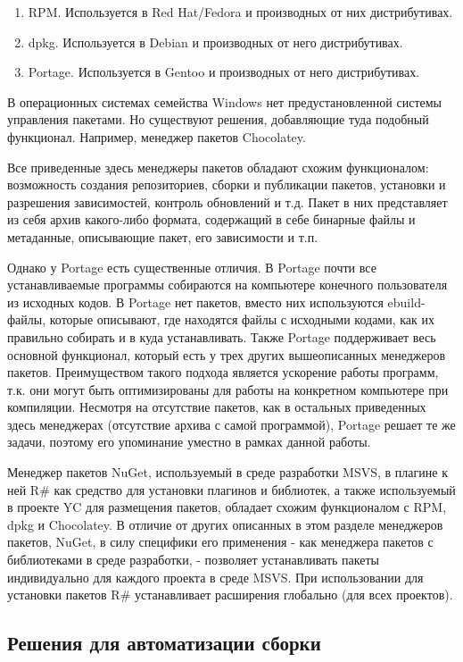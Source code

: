\documentclass{matmex-diploma}
\begin{document}
\begin{enumerate}
\item
RPM. Используется в Red Hat/Fedora и производных от них дистрибутивах.
\item
dpkg. Используется в Debian и производных от него дистрибутивах.
\item
Portage. Используется в Gentoo и производных от него дистрибутивах.
\end{enumerate}

В операционных системах семейства Windows нет предустановленной системы управления пакетами. Но существуют решения, добавляющие туда подобный функционал. Например, менеджер пакетов Chocolatey.

Все приведенные здесь менеджеры пакетов обладают схожим функционалом: возможность создания репозиториев, сборки и публикации пакетов, установки и разрешения зависимостей, контроль обновлений и т.д. Пакет в них представляет из себя архив какого-либо формата, содержащий в себе бинарные файлы и метаданные, описывающие пакет, его зависимости и т.п.

Однако у Portage есть существенные отличия. В Portage почти все устанавливаемые программы собираются на компьютере конечного пользователя из исходных кодов. В Portage нет пакетов, вместо них используются ebuild-файлы, которые описывают, где находятся файлы с исходными кодами, как их правильно собирать и в куда устанавливать. Также Portage поддерживает весь основной функционал, который есть у трех других вышеописанных менеджеров пакетов. Преимуществом такого подхода является ускорение работы программ, т.к. они могут быть оптимизированы для работы на конкретном компьютере при компиляции. Несмотря на отсутствие пакетов, как в остальных приведенных здесь менеджерах (отсутствие архива с самой программой), Portage решает те же задачи, поэтому его упоминание уместно в рамках данной работы.

Менеджер пакетов NuGet, используемый в среде разработки MSVS, в плагине к ней R\# как средство для установки плагинов и библиотек, а также используемый в проекте YC для размещения пакетов, обладает схожим функционалом с RPM, dpkg и Chocolatey. В отличие от других описанных в этом разделе менеджеров пакетов, NuGet, в силу специфики его применения - как менеджера пакетов с библиотеками в среде разработки, - позволяет устанавливать пакеты индивидуально для каждого проекта в среде MSVS. При использовании для установки пакетов R\# устанавливает расширения глобально (для всех проектов).

\subsection{Решения для автоматизации сборки}
\end{document}
